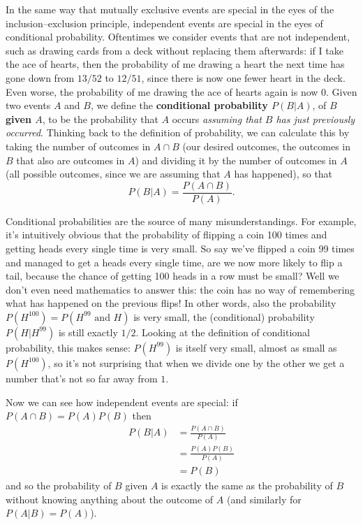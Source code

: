 \documentclass[fleqn,a4paper]{article}
\theoremstyle{definition}
\theoremstyle{definition}
\theoremstyle{definition}
\theoremstyle{definition}
\theoremstyle{remark}
\begin{document}
In the same way that mutually exclusive events are special in the eyes of the inclusion--exclusion principle, independent events are special in the eyes of conditional probability.
Oftentimes we consider events that are not independent, such as drawing cards from a deck without replacing them afterwards: if I take the ace of hearts, then the probability of me drawing a heart the next time has gone down from \(13/52\) to \(12/51\), since there is now one fewer heart in the deck.
Even worse, the probability of me drawing the ace of hearts again is now \(0\).
Given two events \(A\) and \(B\), we define the \textbf{conditional probability \(P(B|A)\)}, of \textbf{\(B\) given \(A\)}, to be the probability that \(A\) occurs \emph{assuming that \(B\) has just previously occurred}.
Thinking back to the definition of probability, we can calculate this by taking the number of outcomes in \(A\cap B\) (our desired outcomes, the outcomes in \(B\) that also are outcomes in \(A\)) and dividing it by the number of outcomes in \(A\) (all possible outcomes, since we are assuming that \(A\) has happened), so that
\[
  P(B|A)
  = \frac{P(A\cap B)}{P(A)}.
\]

Conditional probabilities are the source of many misunderstandings.
For example, it's intuitively obvious that the probability of flipping a coin 100 times and getting heads every single time is very small.
So say we've flipped a coin 99 times and managed to get a heads every single time, are we now more likely to flip a tail, because the chance of getting 100 heads in a row must be small?
Well we don't even need mathematics to answer this: the coin has no way of remembering what has happened on the previous flips!
In other words, also the probability \(P(H^{100})=P(H^{99}\text{ and }H)\) is very small, the (conditional) probability \(P(H|H^{99})\) is still exactly \(1/2\).
Looking at the definition of conditional probability, this makes sense: \(P(H^{99})\) is itself very small, almost as small as \(P(H^{100})\), so it's not surprising that when we divide one by the other we get a number that's not so far away from \(1\).

Now we can see how independent events are special: if \(P(A\cap B)=P(A)P(B)\) then
\[
  \begin{aligned}
    P(B|A)
    &= \frac{P(A\cap B)}{P(A)}
  \\&= \frac{P(A)P(B)}{P(A)}
  \\&= P(B)
  \end{aligned}
\]
and so the probability of \(B\) given \(A\) is exactly the same as the probability of \(B\) without knowing anything about the outcome of \(A\) (and similarly for \(P(A|B)=P(A)\)).
\end{document}
